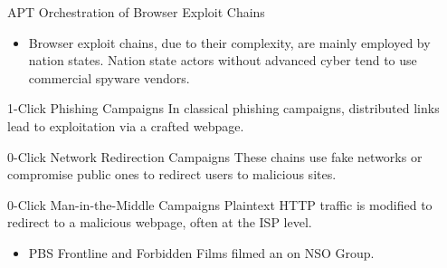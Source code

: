 \begin{frame}{APT Orchestration of Browser Exploit Chains}
    \begin{itemize}
        \item Browser exploit chains, due to their complexity, are mainly employed by nation states. 
        Nation state actors without advanced cyber tend to use commercial spyware vendors.
    \end{itemize}
    \begin{block}{1-Click Phishing Campaigns}
        In classical phishing campaigns, distributed links lead to exploitation via a crafted webpage.
    \end{block}
    \begin{block}{0-Click Network Redirection Campaigns}
        These chains use fake networks or compromise public ones to redirect users to malicious sites.
    \end{block}
    \begin{block}{0-Click Man-in-the-Middle Campaigns}
        Plaintext HTTP traffic is modified to redirect to a malicious webpage, often at the ISP level. 
    \end{block} 
    \begin{itemize}
        \item PBS Frontline and Forbidden Films filmed an  \href{https://www.pbs.org/wgbh/frontline/documentary/global-spyware-scandal-exposing-pegasus/}{\color{pink}{excellent documentary}} on NSO Group. 
    \end{itemize}
\end{frame}

